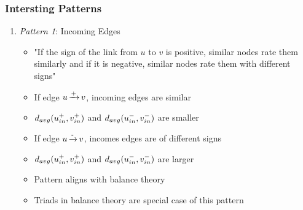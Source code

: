 \documentclass{beamer}
\begin{document}
\begin{frame}
    \frametitle{Intersting Patterns}
    \begin{enumerate}
        \item \textit{Pattern 1}: Incoming Edges 
        \begin{itemize}
            \item "If the sign of the link from $u$ to $v$ is positive, similar nodes rate them similarly and if it is negative, similar nodes rate them with different signs"
            \item If edge $u \operatorname*{\xrightarrow{+}} v$, incoming edges are similar
            \item $d_{avg}(u_{in}^{+},v_{in}^{+})$ and $d_{avg}(u_{in}^{-},v_{in}^{-})$ are smaller
            \item If edge $u \operatorname*{\xrightarrow{-}} v$, incomes edges are of different signs
            \item $d_{avg}(u_{in}^{+},v_{in}^{+})$ and $d_{avg}(u_{in}^{-},v_{in}^{-})$ are larger
            \item Pattern aligns with balance theory
            \item Triads in balance theory are special case of this pattern
        \end{itemize}       
    \end{enumerate}
    \hyperlink{slide:results}{}
\end{frame}
\end{document}
